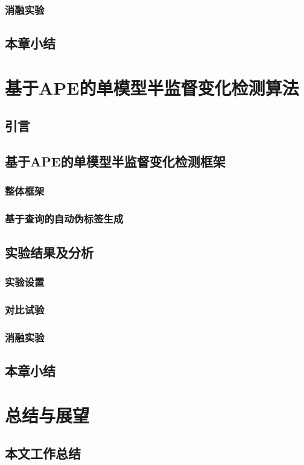 \documentclass[lang=chs, degree=master, blindreview=false, adobe=false]{yanputhesis}
\begin{document}
\subsection{消融实验}
\section{本章小结}

\chapter{基于APE的单模型半监督变化检测算法}
\section{引言}
\section{基于APE的单模型半监督变化检测框架}
\subsection{整体框架}
\subsection{基于查询的自动伪标签生成}
\section{实验结果及分析}
\subsection{实验设置}
\subsection{对比试验}
\subsection{消融实验}
\section{本章小结}

\chapter{总结与展望}
\section{本文工作总结}
\end{document}

